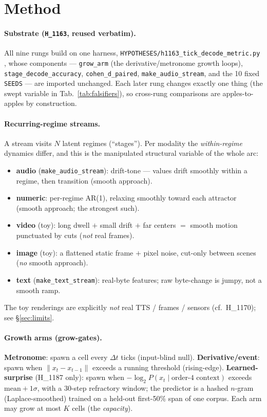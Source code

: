 \documentclass[11pt,a4paper]{article}
\begin{document}
\section{Method}
\label{sec:method}

\paragraph{Substrate (\texttt{H\_1163}, reused verbatim).}
All nine rungs build on one harness, \texttt{HYPOTHESES/h1163\_tick\_decode\_metric.py}
\citep{anima_h1163}, whose components --- \texttt{grow\_arm} (the
derivative/metronome growth loops), \texttt{stage\_decode\_accuracy},
\texttt{cohen\_d\_paired}, \texttt{make\_audio\_stream}, and the 10 fixed
\texttt{SEEDS} --- are imported unchanged. Each later rung changes exactly one
thing (the swept variable in Tab.~\ref{tab:falsifiers}), so cross-rung
comparisons are apples-to-apples by construction.

\paragraph{Recurring-regime streams.}
A stream visits $N$ latent regimes (``stages''). Per modality the
\emph{within-regime} dynamics differ, and this is the manipulated structural
variable of the whole arc:
\begin{itemize}\itemsep0.15em
\item \textbf{audio} (\texttt{make\_audio\_stream}): drift-tone --- values drift
  smoothly within a regime, then transition (smooth approach).
\item \textbf{numeric}: per-regime AR(1), relaxing smoothly toward each attractor
  (smooth approach; the strongest such).
\item \textbf{video} (toy): long dwell $+$ small drift $+$ far centers $=$
  smooth motion punctuated by cuts (\emph{not} real frames).
\item \textbf{image} (toy): a flattened static frame $+$ pixel noise, cut-only
  between scenes (\emph{no} smooth approach).
\item \textbf{text} (\texttt{make\_text\_stream}): real-byte features; raw
  byte-change is jumpy, not a smooth ramp.
\end{itemize}
The toy renderings are explicitly \emph{not} real TTS / frames / sensors (cf.\
H\_1170); see \S\ref{sec:limits}.

\paragraph{Growth arms (grow-gates).}
\textbf{Metronome}: spawn a cell every $\Delta t$ ticks (input-blind null).
\textbf{Derivative/event}: spawn when $\lVert x_t-x_{t-1}\rVert$ exceeds a running
threshold (rising-edge). \textbf{Learned-surprise} (H\_1187 only): spawn when
$-\log_2 P(x_t\mid \text{order-4 context})$ exceeds $\text{mean}{+}1\sigma$, with a
30-step refractory window; the predictor is a hashed $n$-gram (Laplace-smoothed)
trained on a held-out first-50\% span of one corpus. Each arm may grow at most $K$
cells (the \emph{capacity}).
\end{document}
